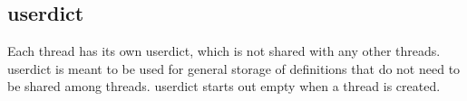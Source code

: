 \subsection{userdict}
\label{sec:userdict}

Each thread has its own userdict, which is not shared with any other threads.
userdict is meant to be used for general storage of definitions that do not need
to be shared among threads.  userdict starts out empty when a thread is
created.

